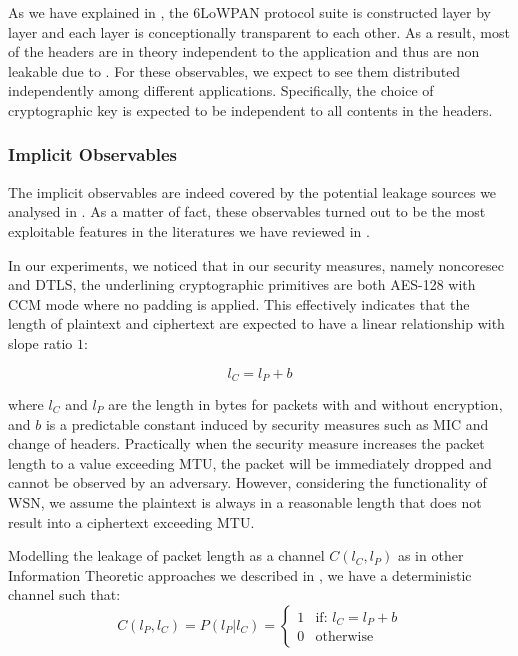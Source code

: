 As we have explained in , the 6LoWPAN protocol suite is constructed layer by layer and each layer is conceptionally transparent to each other. As a result, most of the headers are in theory independent to the application and thus are non leakable due to . For these observables, we expect to see them distributed independently among different applications. Specifically, the choice of cryptographic key is expected to be independent to all contents in the headers.

\subsubsection{Implicit Observables}

The implicit observables are indeed covered by the potential leakage sources we analysed in . As a matter of fact, these observables turned out to be the most exploitable features in the literatures we have reviewed in .

In our experiments, we noticed that in our security measures, namely noncoresec and DTLS, the underlining cryptographic primitives are both AES-128 with CCM mode where no padding is applied. This effectively indicates that the length of plaintext and ciphertext are expected to have a linear relationship with slope ratio $1$:

\begin{equation} \label{Eq: Linear Length}
	l_{C} = l_{P} + b
\end{equation}

where $l_{C}$ and $l_{P}$ are the length in bytes for packets with and without encryption, and $b$ is a predictable constant induced by security measures such as MIC and change of headers. Practically when the security measure increases the packet length to a value exceeding MTU, the packet will be immediately dropped and cannot be observed by an adversary. However, considering the functionality of WSN, we assume the plaintext is always in a reasonable length that does not result into a ciphertext exceeding MTU.

Modelling the leakage of packet length as a channel $C(l_{C},l_{P})$ as in other Information Theoretic approaches we described in , we have a deterministic channel such that:
\begin{equation}
	C(l_{P}, l_{C}) = P(l_{P} | l_{C}) = 
	\begin{cases}
		1 &\text{if: } l_{C} = l_{P} + b \\
		0 &\text{otherwise}
	\end{cases}
\end{equation}

